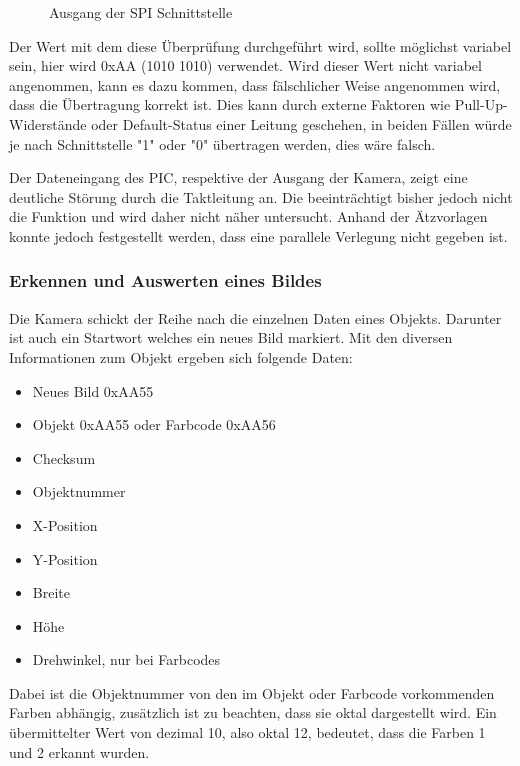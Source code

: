     \begin{figure}[tbh]
      \begin{centering}
      \par\end{centering}
      \caption{Ausgang der SPI Schnittstelle}
      \label{SPI-Ausgang}
    \end{figure}

    Der Wert mit dem diese Überprüfung durchgeführt wird, sollte möglichst variabel sein, hier wird 0xAA (1010 1010) verwendet.
    Wird dieser Wert nicht variabel angenommen, kann es dazu kommen, dass fälschlicher Weise angenommen wird, dass die Übertragung korrekt ist. Dies kann durch externe Faktoren wie
    Pull-Up-Widerstände oder Default-Status einer Leitung geschehen, in beiden Fällen würde je nach Schnittstelle "1" oder "0" übertragen werden, dies wäre falsch.

    Der Dateneingang des PIC, respektive der Ausgang der Kamera, zeigt eine deutliche Störung durch die Taktleitung an. Die beeinträchtigt bisher jedoch nicht die Funktion
    und wird daher nicht näher untersucht. Anhand der Ätzvorlagen konnte jedoch festgestellt werden, dass eine parallele Verlegung nicht gegeben ist.

    \subsubsection{Erkennen und Auswerten eines Bildes}
    Die Kamera schickt der Reihe nach die einzelnen Daten eines Objekts. Darunter ist auch ein Startwort welches ein neues Bild markiert.
    Mit den diversen Informationen zum Objekt ergeben sich folgende Daten:
    \begin{itemize}
      \item Neues Bild 0xAA55
      \item Objekt 0xAA55 oder Farbcode 0xAA56
      \item Checksum
      \item Objektnummer
      \item X-Position
      \item Y-Position
      \item Breite
      \item Höhe
      \item Drehwinkel, nur bei Farbcodes
    \end{itemize}
    Dabei ist die Objektnummer von den im Objekt oder Farbcode vorkommenden Farben abhängig, zusätzlich ist zu beachten, dass sie oktal dargestellt wird.
    Ein übermittelter Wert von dezimal 10, also oktal 12, bedeutet, dass die Farben 1 und 2 erkannt wurden.

